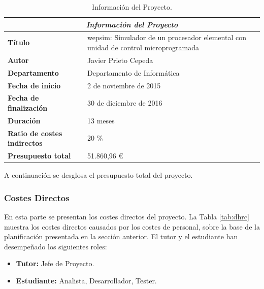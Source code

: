 \begin{center}
\begin{table}[htbp]
\centering
\caption{Información del Proyecto.}
\begin{tabular}{@{}p{3.5cm} p{9cm}@{}} 
\toprule
\multicolumn{2}{c}{\textbf{\textit{Información del Proyecto}}}\\
\midrule
\textbf{Título} 					& \acrshort{wepsim}: Simulador de un procesador elemental con unidad de control microprogramada \\
\midrule
\textbf{Autor} 					& Javier Prieto Cepeda \\
\midrule
\textbf{Departamento} 				& Departamento de Informática \\
\midrule
\textbf{Fecha de inicio}				&2 de noviembre de 2015 \\
\midrule
\textbf{Fecha de finalización}				& 30 de diciembre de 2016 \\
\midrule
\textbf{Duración} 				& 13 meses \\
\midrule
\textbf{Ratio de costes indirectos} 	& 20 \% \\
\midrule
\textbf{Presupuesto total} 			& 51.860,96 \euro \\
\bottomrule
\end{tabular}
\label{tab:project_information}
\end{table}
\end{center}

\vspace{5cm}

A continuación se desglosa el presupuesto total del proyecto.

\subsubsection{Costes Directos}

En esta parte se presentan los costes directos del proyecto. La Tabla \ref{tab:dhrc} muestra los costes directos causados por los costes de personal, sobre la base de la planificación presentada en la sección anterior. El tutor y el estudiante han desempeñado los siguientes roles:

\begin{itemize}

\item \textbf{Tutor:} Jefe de Proyecto.

\item \textbf{Estudiante:} Analista, Desarrollador, Tester.

\end{itemize} 

